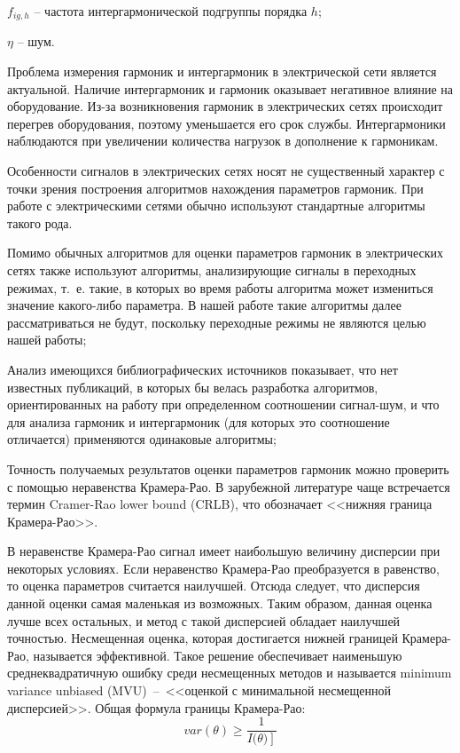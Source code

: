 $f_{ig,h}$ – частота интергармонической подгруппы порядка $h$;

$\eta$ – шум.

Проблема измерения гармоник и интергармоник в электрической сети является актуальной.
Наличие интергармоник и гармоник оказывает негативное влияние на оборудование. Из-за возникновения гармоник в электрических сетях происходит перегрев оборудования, поэтому уменьшается его срок службы. Интергармоники наблюдаются при увеличении количества нагрузок в дополнение к гармоникам.

Особенности сигналов в электрических сетях носят не существенный характер с точки зрения построения алгоритмов нахождения параметров гармоник. При работе с электрическими сетями обычно используют стандартные алгоритмы такого рода. 

Помимо обычных алгоритмов для оценки параметров гармоник в электрических сетях также используют алгоритмы, анализирующие сигналы в переходных режимах, т.~е. такие, в которых во время работы алгоритма может измениться значение какого-либо параметра. В нашей работе такие алгоритмы далее рассматриваться не будут, поскольку переходные режимы не являются целью нашей работы;

Анализ имеющихся библиографических источников показывает, что нет известных публикаций, в которых бы велась разработка алгоритмов, ориентированных на работу при определенном соотношении сигнал-шум, и что для анализа гармоник и интергармоник (для которых это соотношение отличается) применяются одинаковые алгоритмы; 

Точность получаемых результатов оценки параметров гармоник можно проверить с помощью неравенства Крамера-Рао. В зарубежной литературе чаще встречается термин Cramer-Rao lower bound (CRLB), что обозначает <<нижняя граница Крамера-Рао>>. 

В неравенстве Крамера-Рао сигнал имеет наибольшую величину дисперсии при некоторых условиях. Если неравенство Крамера-Рао преобразуется в равенство, то оценка параметров считается наилучшей. Отсюда следует, что дисперсия данной оценки самая маленькая из возможных. Таким образом, данная оценка лучше всех остальных, и метод с такой дисперсией обладает наилучшей точностью. Несмещенная оценка, которая достигается нижней границей Крамера-Рао, называется эффективной. Такое решение обеспечивает наименьшую среднеквадратичную ошибку среди несмещенных методов и называется minimum variance unbiased (MVU)~--~<<оценкой с минимальной несмещенной дисперсией>>. Общая формула границы Крамера-Рао:
\begin{equation}
	\label{eq:equation2}
	var(\theta)\geq\frac{1}{I(\left.\theta)\right]}
\end{equation}


